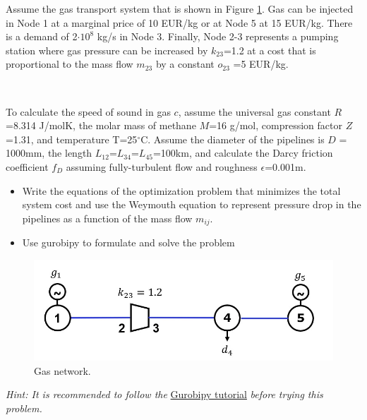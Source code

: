 \documentclass[10pt]{article}
\newenvironment{problem}[2][Problem]{\begin{trivlist}
\item[\hskip \labelsep {\bfseries #1}\hskip \labelsep {\bfseries #2.}]}{\end{trivlist}}
\begin{document}
\begin{problem}{6.3}

Assume the gas transport system that is shown in Figure \ref{fig_gas_network}. Gas can be injected in Node 1 at a marginal price of 10 EUR/kg or at Node 5 at 15 EUR/kg. There is a demand of 2$\cdot 10^8$ kg/s in Node 3. Finally, Node 2-3 represents a pumping station where gas pressure can be increased by $k_{23}$=1.2 at a cost that is proportional to the mass flow $m_{23}$  by a constant $o_{23}$ =5 EUR/kg.

\

To calculate the speed of sound in gas $c$, assume the universal gas constant $R$=8.314 J/molK, the molar mass of methane $M$=16 g/mol, compression factor $Z$=1.31, and temperature T=25$^{\circ}$C. Assume the diameter of the pipelines is $D$ = 1000mm, the length $L_{12}$=$L_{34}$=$L_{45}$=100km, and calculate the Darcy friction  coefficient $f_{D}$ assuming fully-turbulent flow and roughness $\epsilon$=0.001m. 

\begin{itemize}

\item[a)] Write the equations of the optimization problem that minimizes the total system cost and use the Weymouth equation to represent pressure drop in the pipelines as a function of the mass flow $m_{ij}$.


\item[b)] Use gurobipy to formulate and solve the problem


\end{itemize}

\begin{figure}[h]
    \centering
    \includegraphics[width=0.6\linewidth]{figures/gas_network.jpg}
    \caption{Gas network.}
    \label{fig_gas_network}
\end{figure}

\textit{Hint: It is recommended to follow the} \href{https://martavp.github.io/integrated-energy-grids/intro-gurobipy.html#}{Gurobipy tutorial} \textit{before trying this problem.}
\end{problem}

\end{document}
